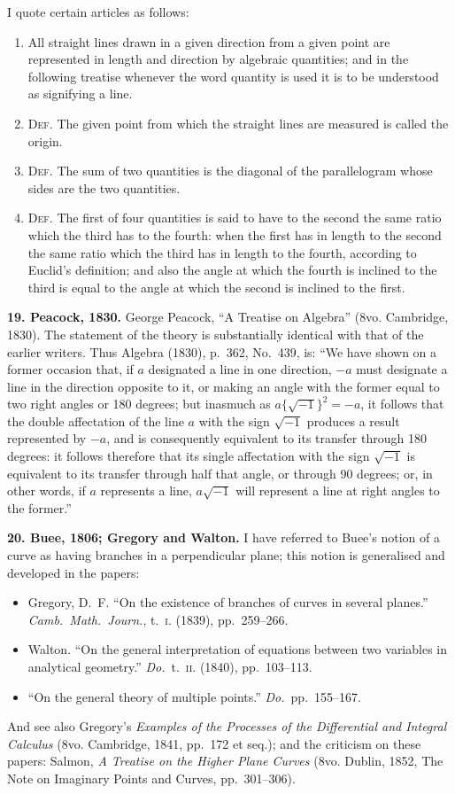 \documentclass[11pt,a4paper]{book}
\begin{document}
I quote certain articles as follows:
\begin{enumerate}[label=(\arabic*)]
\item All straight lines drawn in a given direction from a given point are represented in length and direction by algebraic quantities; and in the following treatise whenever the word quantity is used it is to be understood as signifying a line.
\item \textsc{Def.} The given point from which the straight lines are measured is called the origin.
\item \textsc{Def.} The sum of two quantities is the diagonal of the parallelogram whose sides are the two quantities.
\setcounter{enumi}{11}
\item \textsc{Def.} The first of four quantities is said to have to the second the same ratio which the third has to the fourth: when the first has in length to the second the same ratio which the third has in length to the fourth, according to Euclid's definition; and also the angle at which the fourth is inclined to the third is equal to the angle at which the second is inclined to the first.
\end{enumerate}

\textbf{19. Peacock, 1830.} George Peacock, ``A Treatise on Algebra'' (8vo. Cambridge, 1830). The statement of the theory is substantially identical with that of the earlier writers. Thus Algebra (1830), p.~362, No.~439, is: ``We have shown on a former occasion that, if $a$ designated a line in one direction, $-a$ must designate a line in the direction opposite to it, or making an angle with the former equal to two right angles or 180 degrees; but inasmuch as $a\{\sqrt{-1}\}^2 = -a$, it follows that the double affectation of the line $a$ with the sign $\sqrt{-1}$ produces a result represented by $-a$, and is consequently equivalent to its transfer through 180 degrees: it follows therefore that its single affectation with the sign $\sqrt{-1}$ is equivalent to its transfer through half that angle, or through 90 degrees; or, in other words, if $a$ represents a line, $a\sqrt{-1}$ will represent a line at right angles to the former.''

\textbf{20. Buee, 1806; Gregory and Walton.} I have referred to Buee's notion of a curve as having branches in a perpendicular plane; this notion is generalised and developed in the papers:
\begin{itemize}
\item Gregory, D.~F. ``On the existence of branches of curves in several planes.'' \textit{Camb.\ Math.\ Journ.}, t.~\textsc{i}. (1839), pp.~259--266.
\item Walton. ``On the general interpretation of equations between two variables in analytical geometry.'' \textit{Do.}\ t.~\textsc{ii}. (1840), pp.~103--113.
\item ``On the general theory of multiple points.'' \textit{Do.}\ pp.~155--167.
\end{itemize}
And see also Gregory's \textit{Examples of the Processes of the Differential and Integral Calculus} (8vo. Cambridge, 1841, pp.~172 et seq.); and the criticism on these papers: Salmon, \textit{A Treatise on the Higher Plane Curves} (8vo. Dublin, 1852, The Note on Imaginary Points and Curves, pp.~301--306).
\end{document}
